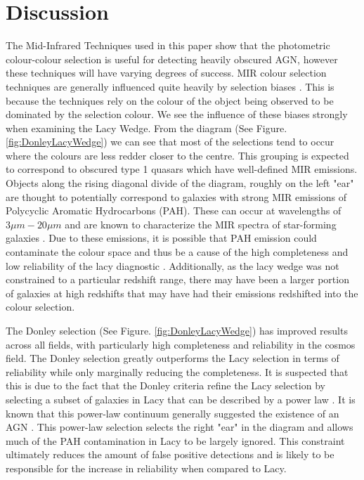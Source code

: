 \documentclass[11pt]{iopart}
\begin{document}
\section{Discussion}
The Mid-Infrared Techniques used in this paper show that the photometric colour-colour selection is useful for detecting heavily obscured AGN, however these techniques will have varying degrees of success. MIR colour selection techniques are generally influenced quite heavily by selection biases \cite{lacy_optical_2007}. This is because the techniques rely on the colour of the object being observed to be dominated by the selection colour. We see the influence of these biases strongly when examining the Lacy Wedge. From the diagram (See Figure. \ref{fig:DonleyLacyWedge}) we can see that most of the selections tend to occur where the colours are less redder closer to the centre. This grouping is expected to correspond to obscured type 1 quasars which have well-defined MIR emissions\cite{lacy_optical_2007}. Objects along the rising diagonal divide of the diagram, roughly on the left "ear" are thought to potentially correspond to galaxies with strong MIR emissions of Polycyclic Aromatic Hydrocarbons (PAH)\cite{lacy_optical_2007, sajina_simulating_2005}. These can occur at wavelengths of $3\mu m-20\mu m$ and are known to characterize the MIR spectra of star-forming galaxies \cite{langeroodi_pah_2023}. Due to these emissions, it is possible that PAH emission could contaminate the colour space and thus be a cause of the high completeness and low reliability of the lacy diagnostic \cite{hickox_obscured_2018}. Additionally, as the lacy wedge was not constrained to a particular redshift range, there may have been a larger portion of galaxies at high redshifts that may have had their emissions redshifted into the colour selection. \par The Donley selection (See Figure. \ref{fig:DonleyLacyWedge}) has improved results across all fields, with particularly high completeness and reliability in the cosmos field. The Donley selection greatly outperforms the Lacy selection in terms of reliability while only marginally reducing the completeness. It is suspected that this is due to the fact that the Donley criteria refine the Lacy selection by selecting a subset of galaxies in Lacy that can be described by a power law \cite{donley_identifying_2012, alonsoherrero_infrared_2006}. It is known that this power-law continuum generally suggested the existence of an AGN \cite{elvis_atlas_1994}. This power-law selection selects the right "ear" in the diagram and allows much of the PAH contamination in Lacy to be largely ignored. This constraint ultimately reduces the amount of false positive detections and is likely to be responsible for the increase in reliability when compared to Lacy. \par 
\end{document}
